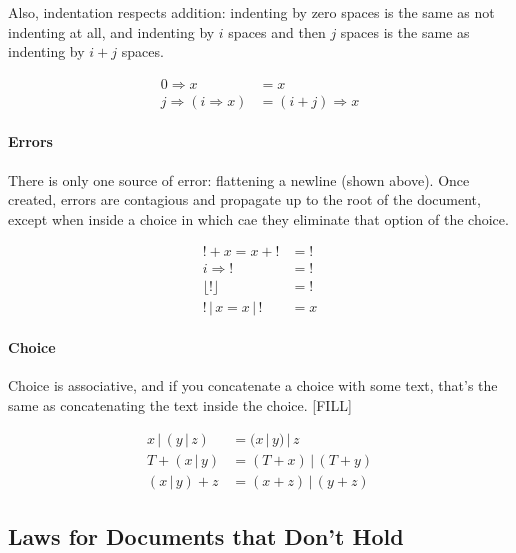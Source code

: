 \documentclass{article}
\newcommand{\txt}{T}
\newcommand{\err}{{!}}
\newcommand{\ind}[2]{#1 \Rightarrow #2}
\renewcommand{\flat}[1]{\lfloor #1 \rfloor}
\newcommand{\cat}[2]{#1 + #2}
\newcommand{\choice}[2]{#1 \,|\, #2}
\begin{document}
Also, indentation respects addition: indenting by zero spaces is the same as not indenting at all,
and indenting by $i$ spaces and then $j$ spaces is the same as indenting by $i+j$ spaces.

\begin{align*}
  \ind{0}{x} &= x
    \tag{indent-identity} \\
  \ind{j}{(\ind{i}{x})} &= \ind{(i+j)}{x}
    \tag{indent-compose}
\end{align*}

\paragraph{Errors}
There is only one source of error: flattening a newline (shown above). Once created, errors are
contagious and propagate up to the root of the document, except when inside a choice in which cae
they eliminate that option of the choice.

\begin{align*}
  \cat{\err}{x} = \cat{x}{\err} &= \err
    \tag{error-concat} \\
  \ind{i}{\err} &= \err
    \tag{error-indent} \\
  \flat{\err} &= \err
    \tag{error-flat} \\
  \choice{\err}{x} = \choice{x}{\err} &= x
    \tag{error-choice}
\end{align*}

\paragraph{Choice}
Choice is associative, and if you concatenate a choice with some text, that's the same as
concatenating the text inside the choice. [FILL]

\begin{align*}
  \choice{x}{(\choice{y}{z})} &= \choice{(\choice{x}{y})}{z}
    \tag{choice-assoc} \\
  \cat{\txt}{(\choice{x}{y})} &= \choice{(\cat{\txt}{x})}{(\cat{\txt}{y})}
    \tag{choice-distr-text-left} \\
  \cat{(\choice{x}{y})}{z} &= \choice{(\cat{x}{z})}{(\cat{y}{z})}
    \tag{choice-distr-right}
\end{align*}

\subsection{Laws for Documents that Don't Hold}
\end{document}
